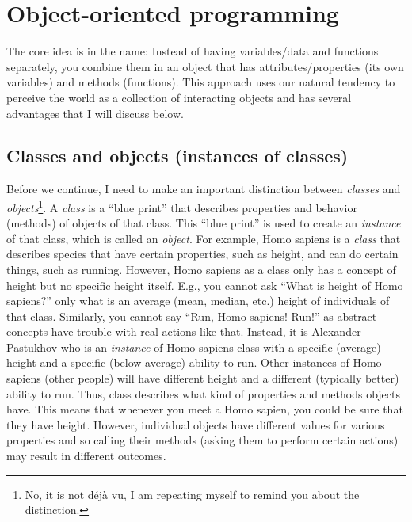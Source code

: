 \documentclass[
]{book}
\begin{document}
\hypertarget{object-oriented-programming}{%
\section{Object-oriented programming}\label{object-oriented-programming}}

The core idea is in the name: Instead of having variables/data and functions separately, you combine them in an object that has attributes/properties (its own variables) and methods (functions). This approach uses our natural tendency to perceive the world as a collection of interacting objects and has several advantages that I will discuss below.

\hypertarget{classes-and-objects-instances-of-classes}{%
\subsection{Classes and objects (instances of classes)}\label{classes-and-objects-instances-of-classes}}

Before we continue, I need to make an important distinction between \emph{classes} and \emph{objects}\footnote{No, it is not déjà vu, I am repeating myself to remind you about the distinction.}. A \emph{class} is a ``blue print'' that describes properties and behavior (methods) of objects of that class. This ``blue print'' is used to create an \emph{instance} of that class, which is called an \emph{object}. For example, Homo sapiens is a \emph{class} that describes species that have certain properties, such as height, and can do certain things, such as running. However, Homo sapiens as a class only has a concept of height but no specific height itself. E.g., you cannot ask ``What is height of Homo sapiens?'' only what is an average (mean, median, etc.) height of individuals of that class. Similarly, you cannot say ``Run, Homo sapiens! Run!'' as abstract concepts have trouble with real actions like that. Instead, it is Alexander Pastukhov who is an \emph{instance} of Homo sapiens class with a specific (average) height and a specific (below average) ability to run. Other instances of Homo sapiens (other people) will have different height and a different (typically better) ability to run. Thus, class describes what kind of properties and methods objects have. This means that whenever you meet a Homo sapien, you could be sure that they have height. However, individual objects have different values for various properties and so calling their methods (asking them to perform certain actions) may result in different outcomes.
\end{document}
